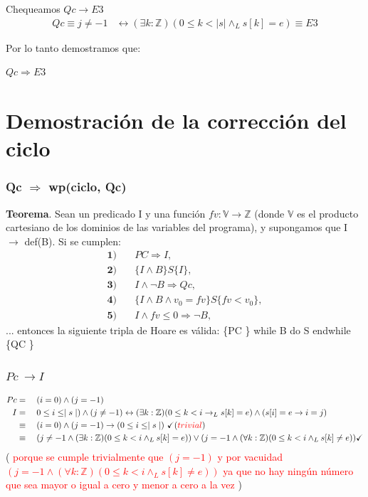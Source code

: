\documentclass[12pt]{book}
\begin{document}
Chequeamos $Qc \rightarrow E3 $ 
\begin{align*}
Qc \equiv j \neq -1 & \leftrightarrow (\exists k : \mathbb{Z})(0 \leq k < |s| \wedge_L s[k] = e) \equiv E3
\end{align*}
\begin{shaded}
Por lo tanto demostramos que: 
\begin{center}
$Qc \Rightarrow E3$ 
\end{center}
\end{shaded}
\chapter{Demostraci\'on de la correcci\'on del ciclo}
\subsection{Qc $\Rightarrow$ wp(ciclo, Qc)}
\begin{shaded}
\textbf{Teorema}. Sean un predicado I y una funci\'on $ fv : \mathbb{V} \rightarrow \mathbb{Z} $
(donde $ \mathbb{V} $ es el producto cartesiano de los dominios de las variables del programa), y supongamos que I $ \rightarrow $ def(B). Si se cumplen: \\
\begin{align*}
\textbf{1)}\quad & PC \Rightarrow I, \\
\textbf{2)}\quad & \{I \wedge B \} S \{I \}, \\
\textbf{3)}\quad & I \wedge \neg B \Rightarrow Qc , \\
\textbf{4)}\quad & \{I \wedge B \wedge v_0 = fv \} S \{fv < v_0 \}, \\
\textbf{5)}\quad & I \wedge fv \leq 0 \Rightarrow \neg B, 
\end{align*}
... entonces la siguiente tripla de Hoare es v\'alida: \{PC \} while B do S endwhile \{QC \}
\end{shaded}
\subsection{$ Pc \ \rightarrow I $}
\begin{align*}
Pc &= \quad (i = 0) \wedge (j = -1) \\
I &= \quad 0 \leq i \leq  \mid s \mid) \wedge (j \neq -1) \leftrightarrow (\exists k : \mathbb{Z})(0 \leq k < i \rightarrow_L s[k] = e) \wedge (s[i] = e \rightarrow i = j) \\
&\equiv \quad (i = 0) \wedge (j = -1) \rightarrow ( 0 \leq i \leq  \mid s \mid) \  \checkmark (\textcolor{red}{trivial }) \\
&\equiv \quad (j\neq -1 \land (\exists k: \mathbb{Z})  ( 0\leq k <i \land_L s[k] = e ))  \lor  (j= -1 \land (\forall k: \mathbb{Z})  ( 0\leq k < i \land_L s[k] \neq e )) \checkmark 	
\end{align*}
( \textcolor{red}{porque  se cumple trivialmente que $ (j = -1) $ y por vacuidad $(j= -1 \land (\forall k: \mathbb{Z})  ( 0\leq k < i \land_L s[k] \neq e ))$ ya que no hay ningún número que sea mayor o igual a cero y menor a cero a la vez  }) 
\vspace{0.3cm}
\end{document}
